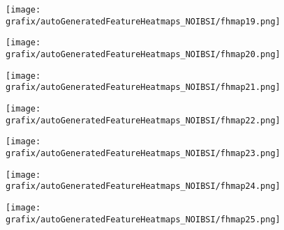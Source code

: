 \begin{subfigure}{\wid\textwidth} 
    \centering 
    \caption{\tiny \sffamily {}} 
    \vspace{\vsp} 
    \texttt{[image: grafix/autoGeneratedFeatureHeatmaps\_NOIBSI/fhmap19.png]} 
\end{subfigure} 
\hspace{\hsp} 
\begin{subfigure}{\wid\textwidth} 
    \centering 
    \caption{\tiny \sffamily {}} 
    \vspace{\vsp} 
    \texttt{[image: grafix/autoGeneratedFeatureHeatmaps\_NOIBSI/fhmap20.png]} 
\end{subfigure} 
\hspace{\hsp} 
\begin{subfigure}{\wid\textwidth} 
    \centering 
    \caption{\tiny \sffamily {}} 
    \vspace{\vsp} 
    \texttt{[image: grafix/autoGeneratedFeatureHeatmaps\_NOIBSI/fhmap21.png]} 
\end{subfigure} 
\hspace{\hsp} 
\begin{subfigure}{\wid\textwidth} 
    \centering 
    \caption{\tiny \sffamily {}} 
    \vspace{\vsp} 
    \texttt{[image: grafix/autoGeneratedFeatureHeatmaps\_NOIBSI/fhmap22.png]} 
\end{subfigure} 
\hspace{\hsp} 
\begin{subfigure}{\wid\textwidth} 
    \centering 
    \caption{\tiny \sffamily {}} 
    \vspace{\vsp} 
    \texttt{[image: grafix/autoGeneratedFeatureHeatmaps\_NOIBSI/fhmap23.png]} 
\end{subfigure} 
\hspace{\hsp} 
\begin{subfigure}{\wid\textwidth} 
    \centering 
    \caption{\tiny \sffamily {}} 
    \vspace{\vsp} 
    \texttt{[image: grafix/autoGeneratedFeatureHeatmaps\_NOIBSI/fhmap24.png]} 
\end{subfigure} 
\hspace{\hsp} 
\begin{subfigure}{\wid\textwidth} 
    \centering 
    \caption{\tiny \sffamily {}} 
    \vspace{\vsp} 
    \texttt{[image: grafix/autoGeneratedFeatureHeatmaps\_NOIBSI/fhmap25.png]} 
\end{subfigure} 
